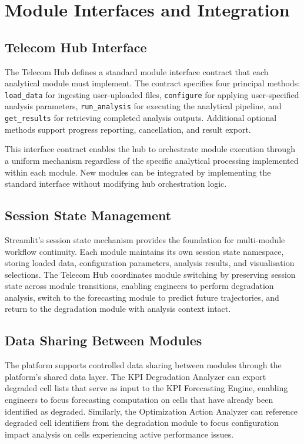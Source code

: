 \section{Module Interfaces and Integration}

\subsection{Telecom Hub Interface}

The Telecom Hub defines a standard module interface contract that each analytical module must implement. The contract specifies four principal methods: \texttt{load\_data} for ingesting user-uploaded files, \texttt{configure} for applying user-specified analysis parameters, \texttt{run\_analysis} for executing the analytical pipeline, and \texttt{get\_results} for retrieving completed analysis outputs. Additional optional methods support progress reporting, cancellation, and result export.

This interface contract enables the hub to orchestrate module execution through a uniform mechanism regardless of the specific analytical processing implemented within each module. New modules can be integrated by implementing the standard interface without modifying hub orchestration logic.

\subsection{Session State Management}

Streamlit's session state mechanism provides the foundation for multi-module workflow continuity. Each module maintains its own session state namespace, storing loaded data, configuration parameters, analysis results, and visualisation selections. The Telecom Hub coordinates module switching by preserving session state across module transitions, enabling engineers to perform degradation analysis, switch to the forecasting module to predict future trajectories, and return to the degradation module with analysis context intact.

\subsection{Data Sharing Between Modules}

The platform supports controlled data sharing between modules through the platform's shared data layer. The KPI Degradation Analyzer can export degraded cell lists that serve as input to the KPI Forecasting Engine, enabling engineers to focus forecasting computation on cells that have already been identified as degraded. Similarly, the Optimization Action Analyzer can reference degraded cell identifiers from the degradation module to focus configuration impact analysis on cells experiencing active performance issues.

